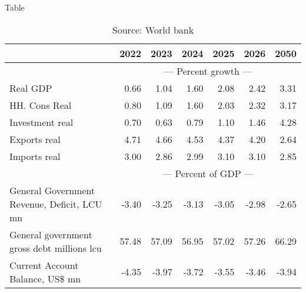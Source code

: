 \documentclass{article}
\begin{document}
\begin{table}[ht]
\caption*{Table}
\begin{tabular}{lrrrrr|r}
\toprule
 & 2022 & 2023 & 2024 & 2025 & 2026 & 2050 \\
\midrule
&\multicolumn{6}{c}{{--- Percent growth ---}}                               \\
Real GDP & 0.66 & 1.04 & 1.60 & 2.08 & 2.42 & 3.31 \\
HH. Cons Real & 0.80 & 1.09 & 1.60 & 2.03 & 2.32 & 3.17 \\
Investment real & 0.70 & 0.63 & 0.79 & 1.10 & 1.46 & 4.28 \\
Exports real & 4.71 & 4.66 & 4.53 & 4.37 & 4.20 & 2.64 \\
Imports real & 3.00 & 2.86 & 2.99 & 3.10 & 3.10 & 2.85 \\
&\multicolumn{6}{c}{{--- Percent of GDP ---}}                               \\
General Government Revenue, Deficit, LCU mn & -3.40 & -3.25 & -3.13 & -3.05 & -2.98 & -2.65 \\
General government gross debt millions lcu & 57.48 & 57.09 & 56.95 & 57.02 & 57.26 & 66.29 \\
Current Account Balance, US\$ mn & -4.35 & -3.97 & -3.72 & -3.55 & -3.46 & -3.94 \\
\bottomrule
\end{tabular}
\caption*{Source: World bank }
\end{table}
\end{document}
